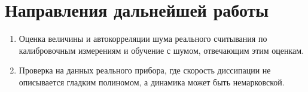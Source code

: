 \documentclass[12pt,a4paper]{report}
\numberwithin{equation}{chapter}
\newif\ifshownotes\shownotesfalse
\begin{document}
\section{Направления дальнейшей работы}

\begin{enumerate}
\item Оценка величины и автокорреляции шума реального считывания по
      калибровочным измерениям и обучение с шумом, отвечающим этим
      оценкам.
\item Проверка на данных реального прибора, где скорость диссипации не
      описывается гладким полиномом, а динамика может быть немарковской.
\end{enumerate}



\ifshownotes
\end{document}
